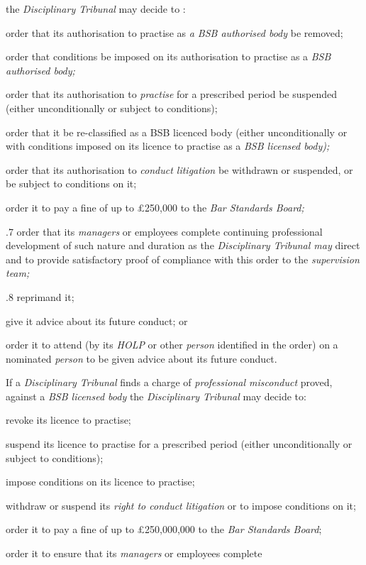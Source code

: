 the \emph{Disciplinary Tribunal} may decide to :\\\nl \item order that its authorisation to practise as \emph{a BSB authorised
body  }be removed;\item order that conditions be imposed on its authorisation to practise as
a \emph{BSB authorised body;}\item order that its authorisation to \emph{practise }for a prescribed
period be suspended (either unconditionally or subject to conditions);\item order that it\emph{ }be re-classified as a BSB licenced body (either
unconditionally or with conditions imposed on its licence to practise as
a \emph{BSB licensed body);}\item  order that its authorisation to \emph{conduct litigation }be
withdrawn or suspended, or be subject to conditions on it;\item order it to pay a fine of up to £250,000 to the \emph{Bar Standards
Board;}\par
.7 order that its \emph{managers }or employees\emph{ }complete
continuing professional development of such nature and duration as
the \emph{Disciplinary Tribunal may }direct and to provide satisfactory
proof of compliance with this order to the \emph{supervision team;}\par
.8 reprimand it;\item give it advice about its future conduct; or\\\item order it to attend (by its \emph{HOLP }or
other \emph{person }identified in the order) on a
nominated \emph{person }to be given advice about its future conduct.\ln
{}\par
If a \emph{Disciplinary Tribunal} finds a charge of \emph{professional
misconduct} proved, against a \emph{BSB licensed
body }the \emph{Disciplinary Tribunal} may decide to:\\\nl \item revoke its licence to practise;\item suspend its licence to practise for a prescribed period (either
unconditionally or subject to conditions);\item impose conditions on its licence to practise;\item withdraw or suspend its \emph{right to conduct litigation} or to
impose conditions on it;\item order it to pay a fine of up to £250,000,000 to the \emph{Bar
Standards Board};\item order it to ensure that its \emph{managers} or employees complete

